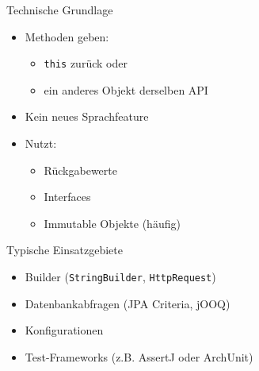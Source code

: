 \begin{frame}{Technische Grundlage}
	\begin{itemize}
		\item Methoden geben:
		\begin{itemize}
			\item \texttt{this} zurück oder
			\item ein anderes Objekt derselben API
		\end{itemize}
		\item Kein neues Sprachfeature
		\item Nutzt:
		\begin{itemize}
			\item Rückgabewerte
			\item Interfaces
			\item Immutable Objekte (häufig)
		\end{itemize}
	\end{itemize}
\end{frame}

\begin{frame}{Typische Einsatzgebiete}
	\begin{itemize}
		\item Builder (\texttt{StringBuilder}, \texttt{HttpRequest})
		\item Datenbankabfragen (JPA Criteria, jOOQ)
		\item Konfigurationen
		\item Test-Frameworks (z.B. AssertJ oder ArchUnit)
	\end{itemize}
\end{frame}
